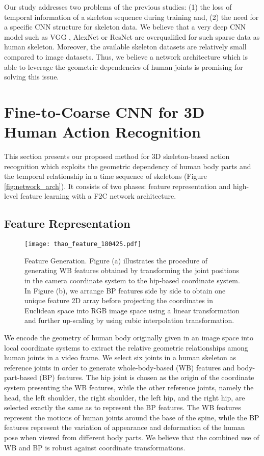 \documentclass{bmvc2k}
\begin{document}
Our study addresses two problems of the previous studies: (1) the loss of temporal information of a skeleton sequence during training and, (2) the need for a specific CNN structure for skeleton data. We believe that a very deep CNN model such as VGG \cite{simonyan2014very}, AlexNet \cite{krizhevsky2012imagenet} or ResNet \cite{he2016deep} are overqualified for such sparse data as human skeleton. Moreover, the available skeleton datasets are relatively small compared to image datasets. Thus, we believe a network architecture which is able to leverage the geometric dependencies of human joints is promising for solving this issue. 
    
\section{Fine-to-Coarse CNN for 3D Human Action Recognition}
	\label{sec:approach}
This section presents our proposed method for 3D skeleton-based action recognition which exploits the geometric dependency of human body parts and the temporal relationship in a time sequence of skeletons (Figure \ref{fig:network_arch}).  It consists of two phases: feature representation and high-level feature learning with a F2C network architecture.

\subsection{Feature Representation}
\begin{figure}[t!]
	\centering
	\texttt{[image: thao\_feature\_180425.pdf]}
	\caption{Feature Generation. Figure (a) illustrates the procedure of generating WB features obtained by transforming the joint positions in the camera coordinate system to the hip-based coordinate system. In Figure (b), we arrange BP features side by side to obtain one unique feature 2D array before projecting the coordinates in Euclidean space into RGB image space using a linear transformation and further up-scaling by using cubic interpolation transformation.}
	\label{fig:wb_bp}
\end{figure}
We encode the geometry of human body originally given in an image space into local coordinate systems to extract the relative geometric relationships among human joints in a video frame. We select six joints in a human skeleton as reference joints in order to generate whole-body-based (WB) features and body-part-based (BP) features. The hip joint is chosen as the origin of the coordinate system presenting the WB features, while the other reference joints, namely the head, the left shoulder, the right shoulder, the left hip, and the right hip, are selected exactly the same as \cite{ke2017skeletonnet} to represent the BP features. The WB features represent the motions of human joints around the base of the spine,  while the BP features represent the variation of appearance and deformation of the human pose when viewed from different body parts. We believe that the combined use of WB and BP is robust against coordinate transformations.
\end{document}
